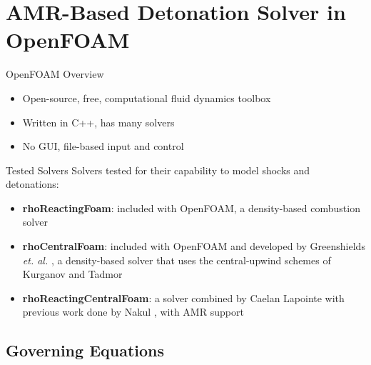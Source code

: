 \section{AMR-Based Detonation Solver in OpenFOAM}

\begin{frame}{OpenFOAM Overview}
\begin{itemize}
\item Open-source, free, computational fluid dynamics toolbox 
\item Written in C++, has many solvers 
\item No GUI, file-based input and control
\end{itemize}
\end{frame}

\begin{frame}{Tested Solvers}
Solvers tested for their capability to model shocks and detonations:
\begin{itemize}
\item \textbf{rhoReactingFoam}: included with OpenFOAM, a density-based combustion solver
\item \textbf{rhoCentralFoam}: included with OpenFOAM and developed by Greenshields \textit{et. al.} \cite{greenshields}, a density-based solver that uses the central-upwind schemes of Kurganov and Tadmor \cite{kurganov1} 
\item \textbf{rhoReactingCentralFoam}: a solver combined by Caelan Lapointe with previous work done by Nakul \cite{nakul}, with AMR support
\end{itemize}
\end{frame}

\subsection{Governing Equations}

